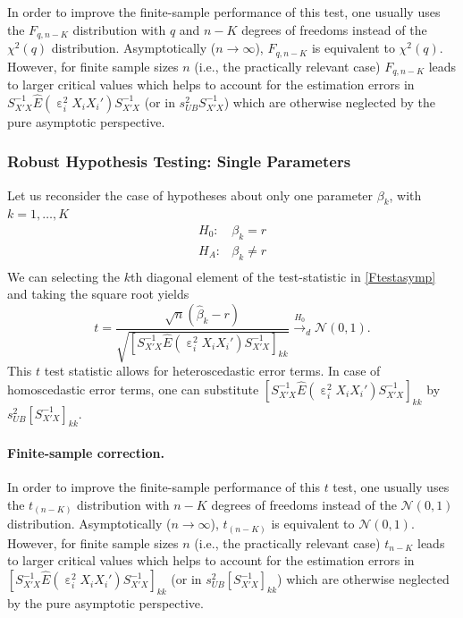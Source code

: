 \documentclass[
  14pt,
]{memoir}
\DeclareMathOperator{\eps}{\varepsilon}
\begin{document}
In order to improve the finite-sample performance of this test, one usually uses the \(F_{q,n-K}\) distribution with \(q\) and \(n-K\) degrees of freedoms instead of the \(\chi^2(q)\) distribution. Asymptotically (\(n\to\infty\)), \(F_{q,n-K}\) is equivalent to \(\chi^2(q)\). However, for finite sample sizes \(n\) (i.e., the practically relevant case) \(F_{q,n-K}\) leads to larger critical values which helps to account for the estimation errors in \(S_{X'X}^{-1}\widehat{E}(\eps^2_iX_iX_i')S^{-1}_{X'X}\) (or in \(s_{UB}^2S_{X'X}^{-1}\)) which are otherwise neglected by the pure asymptotic perspective.

\hypertarget{robust-hypothesis-testing-single-parameters}{%
\subsubsection{Robust Hypothesis Testing: Single Parameters}\label{robust-hypothesis-testing-single-parameters}}

Let us reconsider the case of hypotheses about only one parameter \(\beta_k\), with \(k=1,\dots,K\)
\begin{equation*}
\begin{array}{ll}
H_0: & \beta_k=r\\
H_A: & \beta_k\ne r\\
\end{array}
\end{equation*}
We can selecting the \(k\)th diagonal element of the test-statistic in \eqref{Ftestasymp} and taking the square root yields
\[
t=\frac{\sqrt{n}\left(\hat{\beta}_k-r\right)}{\sqrt{\left[S_{X'X}^{-1}\widehat{E}(\eps^2_iX_iX_i')S^{-1}_{X'X}\right]_{kk}}}\overset{H_0}{\to}_d\mathcal{N}(0,1).
\]
This \(t\) test statistic allows for heteroscedastic error terms. In case of homoscedastic error terms, one can substitute \([S_{X'X}^{-1}\widehat{E}(\eps^2_iX_iX_i')S^{-1}_{X'X}]_{kk}\) by \(s_{UB}^2[S_{X'X}^{-1}]_{kk}\).

\paragraph*{Finite-sample correction.}

In order to improve the finite-sample performance of this \(t\) test, one usually uses the \(t_{(n-K)}\) distribution with \(n-K\) degrees of freedoms instead of the \(\mathcal{N}(0,1)\) distribution. Asymptotically (\(n\to\infty\)), \(t_{(n-K)}\) is equivalent to \(\mathcal{N}(0,1)\). However, for finite sample sizes \(n\) (i.e., the practically relevant case) \(t_{n-K}\) leads to larger critical values which helps to account for the estimation errors in \([S_{X'X}^{-1}\widehat{E}(\eps^2_iX_iX_i')S^{-1}_{X'X}]_{kk}\) (or in \(s_{UB}^2[S_{X'X}^{-1}]_{kk}\)) which are otherwise neglected by the pure asymptotic perspective.
\end{document}
